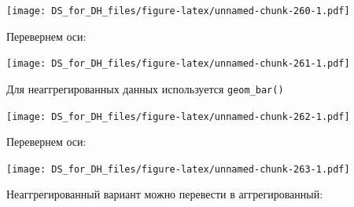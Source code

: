 \documentclass[
]{book}
\newenvironment{Shaded}{\begin{snugshade}}{\end{snugshade}}
\newcommand{\DecValTok}[1]{\textcolor[rgb]{0.00,0.00,0.81}{#1}}
\newcommand{\KeywordTok}[1]{\textcolor[rgb]{0.13,0.29,0.53}{\textbf{#1}}}
\newcommand{\NormalTok}[1]{#1}
\newcommand{\OperatorTok}[1]{\textcolor[rgb]{0.81,0.36,0.00}{\textbf{#1}}}
\newcommand{\StringTok}[1]{\textcolor[rgb]{0.31,0.60,0.02}{#1}}
\begin{document}
\texttt{[image: DS\_for\_DH\_files/figure-latex/unnamed-chunk-260-1.pdf]}

Перевернем оси:

\begin{Shaded}
\end{Shaded}

\texttt{[image: DS\_for\_DH\_files/figure-latex/unnamed-chunk-261-1.pdf]}

Для неаггрегированных данных используется \texttt{geom\_bar()}

\begin{Shaded}
\end{Shaded}

\texttt{[image: DS\_for\_DH\_files/figure-latex/unnamed-chunk-262-1.pdf]}

Перевернем оси:

\begin{Shaded}
\end{Shaded}

\texttt{[image: DS\_for\_DH\_files/figure-latex/unnamed-chunk-263-1.pdf]}

Неаггрегированный вариант можно перевести в аггрегированный:

\begin{Shaded}
\end{Shaded}
\end{document}
